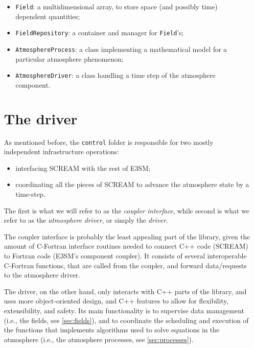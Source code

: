 \documentclass[10pt]{article}
\begin{document}
\begin{itemize}
\item \verb|Field|: a multidimensional array, to store space (and possibly time) dependent quantities;
\item \verb|FieldRepository|: a container and manager for \verb|Field|'s;
\item \verb|AtmosphereProcess|: a class implementing a mathematical model for a particular atmosphere phenomenon;
\item \verb|AtmosphereDriver|: a class handling a time step of the atmosphere component.
\end{itemize}

\section{The driver}
\label{sec:driver}
As mentioned before, the \verb|control| folder is responsible for two mostly independent
infrastructure operations:

\begin{itemize}
\item interfacing SCREAM with the rest of E3SM;
\item coordinating all the pieces of SCREAM to advance the atmosphere state by a time-step.
\end{itemize}

The first is what we will refer to as the \emph{coupler interface}, while second is what
we refer to as the \emph{atmosphere driver}, or simply the \emph{driver}.

The coupler interface is probably the least appealing part of the library,
given the amount of C-Fortran interface routines needed to connect C++ code (SCREAM)
to Fortran code (E3SM's component coupler). It consists of several interoperable
C-Fortran functions, that are called from the coupler, and forward data/requests
to the atmosphere driver.

The driver, on the other hand, only interacts with C++ parts of the library,
and uses more object-oriented design, and C++ features to allow for flexibility,
extensibility, and safety. Its main functionality is to supervise data management
(i.e., the fields, see \ref{sec:fields}), and to coordinate the scheduling and
execution of the functions that implements algorithms used to solve equations in
the atmosphere (i.e., the atmosphere processes, see \ref{sec:processes}).
\end{document}
